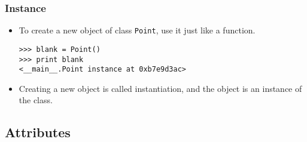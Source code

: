 \documentclass[handout]{beamer}
\newcommand{\beforeverb}{\footnotesize}
\newcommand{\afterverb}{\normalsize}
\begin{document}
\begin{frame}[fragile]
\frametitle{Instance}
\begin{itemize}
\item To create a new object of class {\tt Point}, use it just like a function.
\beforeverb
\begin{verbatim}
>>> blank = Point()
>>> print blank
<__main__.Point instance at 0xb7e9d3ac>
\end{verbatim}
\afterverb
 
\item Creating a new object is called
\alert{instantiation}, and the object is an \alert{ instance} of
the class.

\end{itemize}
\end{frame}
\subsection[Attributes]{Attributes}
\end{document}
